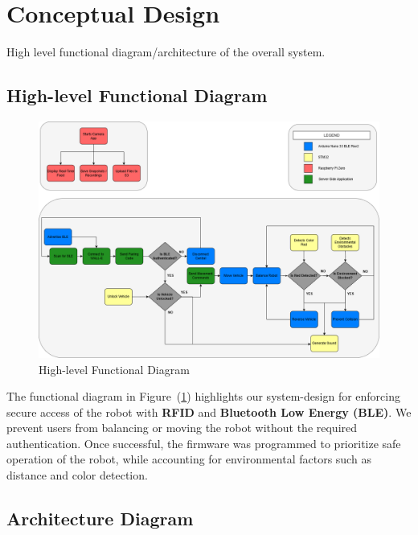 \documentclass{article}
\begin{document}
\section{Conceptual Design}
High level functional diagram/architecture of the overall system.

\subsection{High-level Functional Diagram}

\begin{figure}[H]
    \centering
    \includegraphics[width=1\textwidth]{Figures/Functional_Diagram.png}
    \caption{High-level Functional Diagram}
    \label{fig:functional_diagram}
\end{figure}

\begin{minipage}{\linewidth}
    The functional diagram in Figure~(\ref{fig:functional_diagram}) highlights our system-design for enforcing secure access of the robot with
    \textbf{RFID} and \textbf{Bluetooth Low Energy (BLE)}. We prevent users from balancing or moving the robot without the required authentication. Once successful,
    the firmware was programmed to prioritize safe operation of the robot, while accounting for environmental factors such as distance and color detection. \\
\end{minipage}

\subsection{Architecture Diagram}
\end{document}
